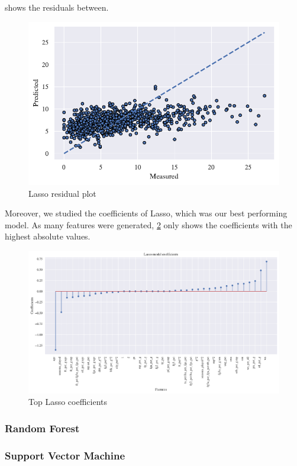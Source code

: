  shows the residuals between.

\begin{figure}[H]
    \centering
    \includegraphics[width=0.6\linewidth]{figures/Lasso_residuals.pdf}
    \caption{Lasso residual plot}
    \label{fig:lasso-res}
\end{figure}

Moreover, we studied the coefficients of Lasso, which was our best performing model. As many features were generated, \cref{fig:lasso-coeff} only shows the coefficients with the highest absolute values.

\begin{figure}[H]
    \centering
    \includegraphics[width=1.0\linewidth]{figures/Lasso_coeffs.pdf}
    \caption{Top Lasso coefficients}
    \label{fig:lasso-coeff}
\end{figure}
\subsubsection{Random Forest}%
\label{ssub:random-forest}

\subsubsection{Support Vector Machine}%
\label{ssub:support-vector-machine}

